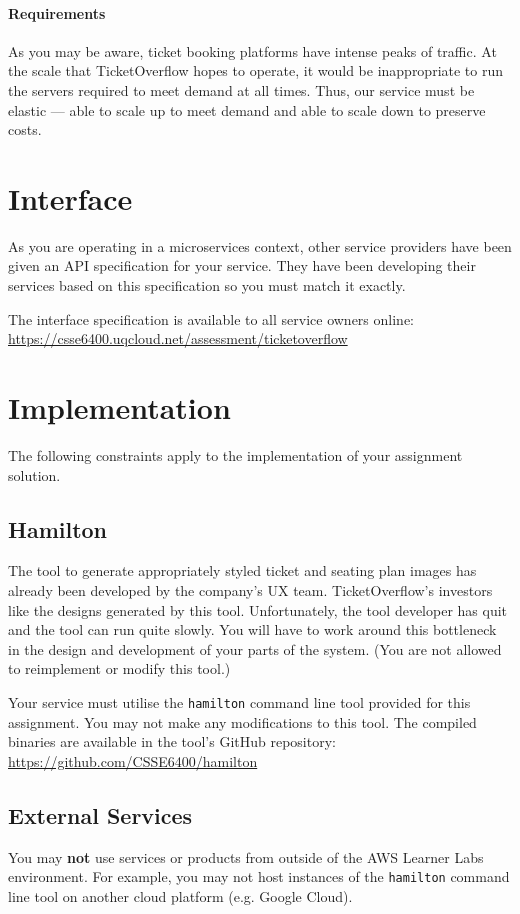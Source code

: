 \documentclass{csse4400}
\begin{document}
\paragraph{Requirements}
As you may be aware,
ticket booking platforms have intense peaks of traffic.
At the scale that TicketOverflow hopes to operate,
it would be inappropriate to run the servers required to meet demand at all times.
Thus, our service must be elastic --- able to scale up to meet demand and able to scale down to preserve costs.

\section{Interface}
As you are operating in a microservices context,
other service providers have been given an API specification for your service.
They have been developing their services based on this specification so you must match it exactly.

The interface specification is available to all service owners online:
\url{https://csse6400.uqcloud.net/assessment/ticketoverflow}

\section{Implementation}
The following constraints apply to the implementation of your assignment solution.

\subsection{Hamilton}
The tool to generate appropriately styled ticket and seating plan images has already been developed by the company's UX team.
TicketOverflow's investors like the designs generated by this tool.
Unfortunately, the tool developer has quit and the tool can run quite slowly.
You will have to work around this bottleneck in the design and development of your parts of the system.
(You are not allowed to reimplement or modify this tool.)

Your service must utilise the \texttt{hamilton} command line tool provided for this assignment.
You may not make any modifications to this tool.
The compiled binaries are available in the tool's GitHub repository:
\url{https://github.com/CSSE6400/hamilton}

\subsection{External Services}
You may \textbf{not} use services or products from outside of the AWS Learner Labs environment.
For example, you may not host instances of the \texttt{hamilton} command line tool on another cloud platform
(e.g. Google Cloud).
\end{document}
